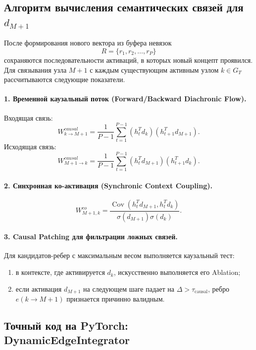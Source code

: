 \documentclass[11pt,a4paper]{article}
\begin{document}
\subsection*{Алгоритм вычисления семантических связей для $d_{M+1}$}

После формирования нового вектора из буфера невязок
\[
R=\{r_1,r_2,\dots,r_P\}
\]
сохраняются последовательности активаций, в которых новый концепт проявился. Для связывания узла $M+1$ с каждым существующим активным узлом $k\in G_T$ рассчитываются следующие показатели.

\paragraph{1. Временной каузальный поток (Forward/Backward Diachronic Flow).}
Входящая связь:
\[
W_{k\rightarrow M+1}^{causal}
=
\frac{1}{P-1}
\sum_{t=1}^{P-1}
(h_t^Td_k)
(h_{t+1}^Td_{M+1}).
\]
Исходящая связь:
\[
W_{M+1\rightarrow k}^{causal}
=
\frac{1}{P-1}
\sum_{t=1}^{P-1}
(h_t^Td_{M+1})
(h_{t+1}^Td_k).
\]

\paragraph{2. Синхронная ко-активация (Synchronic Context Coupling).}
\[
W_{M+1,k}^{co}
=
\frac{\operatorname{Cov}
\left(h_t^Td_{M+1},h_t^Td_k\right)}
{\sigma(d_{M+1})\sigma(d_k)}.
\]

\paragraph{3. Causal Patching для фильтрации ложных связей.}
Для кандидатов-ребер с максимальным весом выполняется каузальный тест:
\begin{enumerate}
    \item в контексте, где активируется $d_k$, искусственно выполняется его Ablation;
    \item если активация $d_{M+1}$ на следующем шаге падает на $\Delta>\tau_{\text{causal}}$, ребро $e(k\rightarrow M+1)$ признается причинно валидным.
\end{enumerate}

\iffalse
\subsection*{Точный код на PyTorch: DynamicEdgeIntegrator}
\end{document}

